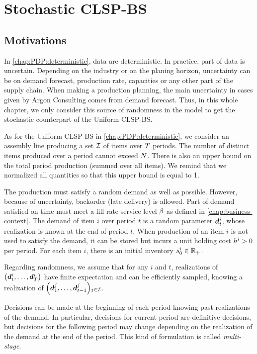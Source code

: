 \chapter{Stochastic CLSP-BS}
\label{chap:PDP:stochastic}

\section{Motivations}


In \cref{chap:PDP:deterministic}, data are deterministic.
In practice, part of data is uncertain.
Depending on the industry or on the planing horizon, uncertainty can be on demand forecast, production rate, capacities or any other part of the supply chain.
When making a production planning, the main uncertainty in cases given by Argon Consulting comes from demand forecast.
Thus, in this whole chapter, we only consider this source of randomness in the model to get the stochastic counterpart of the Uniform CLSP-BS.


As for the Uniform CLSP-BS in \cref{chap:PDP:deterministic}, we consider an assembly line producing a set $\mathcal{I}$ of items over $T$ periods.
The number of distinct items produced over a period cannot exceed $N$.
There is also an upper bound on the total period production (summed over all items).
We remind that we normalized all quantities so that this upper bound is equal to 1.


The production must satisfy a random demand as well as possible.
However, because of uncertainty, backorder (\ie late delivery) is allowed.
Part of demand satisfied on time must meet a fill rate service level $\beta$ as defined in \cref{chap:business-context}.
The demand of item $i$ over period $t$ is a random parameter $\va\demand_t^i$, whose realization is known at the end of period $t$.
When production of an item $i$ is not used to satisfy the demand, it can be stored but incurs a unit holding cost $h^i>0$ per period.
For each item $i$, there is an initial inventory $s_0^i\in\mathbb{R}_+$.


Regarding randomness, we assume that for any $i$ and $t$, realizations of $\bracket{\va\demand_t^i,\ldots,\va\demand_{\horizon}^i}$ have finite expectation and can be efficiently sampled, knowing a realization of $\bracket{\va\demand_1^j,\ldots,\va\demand_{t-1}^j}_{j\in\REF}$.


Decisions can be made at the beginning of each period knowing past realizations of the demand.
In particular, decisions for current period are definitive decisions, but decisions for the following period may change depending on the realization of the demand at the end of the period.
This kind of formulation is called \emph{multi-stage}.


